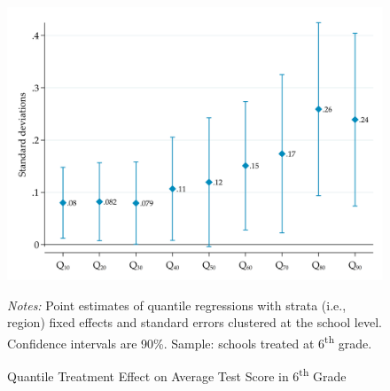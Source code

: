 \documentclass[11pt,a4paper]{article}
\begin{document}
	\begin{figure}[ht!]
		
		\caption{Quantile Treatment Effect on Average Test Score  in 6\textsuperscript{th} Grade}
		\label{fig:qreg_media_grade6}
		\centering
		\includegraphics[width=14cm]{DataWork/Output/Figures/figA2-qreg_media_grade6.png}
		
		\begin{minipage}{0.825\textwidth}
			\small{\textit{Notes:} Point estimates of quantile regressions with strata (i.e., region) fixed effects and standard errors clustered at the school level. Confidence intervals are 90\%. Sample: schools treated at 6\textsuperscript{th} grade.}
		\end{minipage}
	\end{figure}
	
\end{document}
